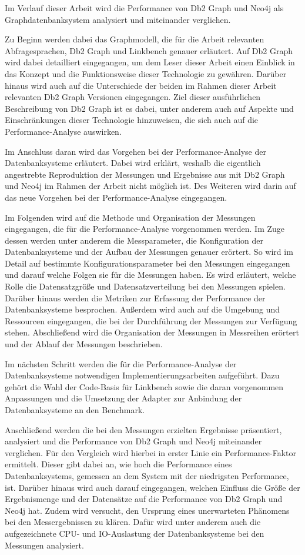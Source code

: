 Im Verlauf dieser Arbeit wird die Performance von Db2 Graph und Neo4j als Graphdatenbanksystem analysiert und miteinander verglichen. 

Zu Beginn werden dabei das Graphmodell, die für die Arbeit relevanten Abfragesprachen, Db2 Graph und Linkbench genauer erläutert. Auf Db2 Graph wird dabei detailliert eingegangen, um dem Leser dieser Arbeit einen Einblick in das Konzept und die Funktionsweise dieser Technologie zu gewähren. Darüber hinaus wird auch auf die Unterschiede der beiden im Rahmen dieser Arbeit relevanten Db2 Graph Versionen eingegangen. Ziel dieser ausführlichen Beschreibung von Db2 Graph ist es dabei, unter anderem auch auf Aspekte und Einschränkungen dieser Technologie hinzuweisen, die sich auch auf die Performance-Analyse auswirken.

Im Anschluss daran wird das Vorgehen bei der Performance-Analyse der Datenbanksysteme erläutert. Dabei wird erklärt, weshalb die eigentlich angestrebte Reproduktion der Messungen und Ergebnisse aus \cite{sigmod_tian} mit Db2 Graph und Neo4j im Rahmen der Arbeit nicht möglich ist. Des Weiteren wird darin auf das neue Vorgehen bei der Performance-Analyse eingegangen. 

Im Folgenden wird auf die Methode und Organisation der Messungen eingegangen, die für die Performance-Analyse vorgenommen werden. Im Zuge dessen werden unter anderem die Messparameter, die Konfiguration der Datenbanksysteme und der Aufbau der Messungen genauer erörtert. So wird im Detail auf bestimmte Konfigurationsparameter bei den Messungen eingegangen und darauf welche Folgen sie für die Messungen haben. Es wird erläutert, welche Rolle die Datensatzgröße und Datensatzverteilung bei den Messungen spielen. Darüber hinaus werden die Metriken zur Erfassung der Performance der Datenbanksysteme besprochen. Außerdem wird auch auf die Umgebung und Ressourcen eingegangen, die bei der Durchführung der Messungen zur Verfügung stehen. Abschließend wird die Organisation der Messungen in Messreihen erörtert und der Ablauf der Messungen beschrieben.  

Im nächsten Schritt werden die für die Performance-Analyse der Datenbanksysteme notwendigen Implementierungsarbeiten aufgeführt. Dazu gehört die Wahl der Code-Basis für Linkbench sowie die daran vorgenommen Anpassungen und die Umsetzung der Adapter zur Anbindung der Datenbanksysteme an den Benchmark. 

Anschließend werden die bei den Messungen erzielten Ergebnisse präsentiert, analysiert und die Performance von Db2 Graph und Neo4j miteinander verglichen. Für den Vergleich wird hierbei in erster Linie ein Performance-Faktor ermittelt. Dieser gibt dabei an, wie hoch die Performance eines Datenbanksystems, gemessen an dem System mit der niedrigsten Performance, ist. Darüber hinaus wird auch darauf eingegangen, welchen Einfluss die Größe der Ergebnismenge und der Datensätze auf die Performance von Db2 Graph und Neo4j hat. Zudem wird versucht, den Ursprung eines unerwarteten Phänomens bei den Messergebnissen zu klären. Dafür wird unter anderem auch die aufgezeichnete CPU- und IO-Auslastung der Datenbanksysteme bei den Messungen analysiert.